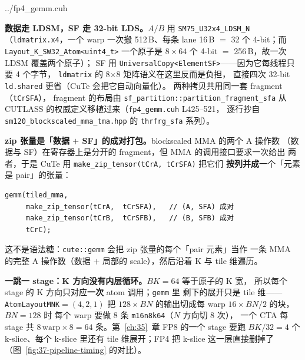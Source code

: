\begin{lstinputlisting}[linerange={794-810},firstnumber=auto,
  title={fp4\_gemm.cuh L794-810（主循环：四路 s2r + zip 张量 + 一跳一 stage）}]{../fp4_gemm.cuh}
\end{lstinputlisting}

\textbf{数据走 LDSM，SF 走 32-bit LDS。}$A/B$ 用
\texttt{SM75\_U32x4\_LDSM\_N}（\texttt{ldmatrix.x4}，一个 warp 一次搬
512\,B、每条 lane 16\,B $=$ 32 个 4-bit；而
\texttt{Layout\_K\_SW32\_Atom<uint4\_t>} 一个原子是
$8\times64$ 个 4-bit $=$ 256\,B，故一次 LDSM 覆盖两个原子）；
SF 用 \texttt{UniversalCopy<ElementSF>}——因为它每线程只要 4 个字节，
\texttt{ldmatrix} 的 8$\times$8 矩阵语义在这里反而是负担，
直接四次 32-bit \texttt{ld.shared} 更省（CuTe 会把它自动向量化）。
两种拷贝共用同一套 fragment（\texttt{tCrSFA}），
fragment 的布局由 \texttt{sf\_partition::partition\_fragment\_sfa} 从
CUTLASS 的权威定义移植过来（\texttt{fp4\_gemm.cuh} L425--521，
逐行抄自 \texttt{sm120\_blockscaled\_mma\_tma.hpp} 的
\texttt{thrfrg\_sfa} 系列）。

\textbf{zip 张量是「数据 $+$ SF」的成对打包。}blockscaled MMA 的两个 A 操作数
（数据与 SF）在寄存器上是分开的 fragment，但 MMA 的调用接口要求一次给出
两者，于是 CuTe 用 \texttt{make\_zip\_tensor(tCrA, tCrSFA)} 把它们
\textbf{按列并成}一个「元素是 pair」的张量：

\begin{verbatim}
gemm(tiled_mma,
     make_zip_tensor(tCrA,  tCrSFA),   // (A, SFA) 成对
     make_zip_tensor(tCrB,  tCrSFB),   // (B, SFB) 成对
     tCrC);
\end{verbatim}

这不是语法糖：\texttt{cute::gemm} 会把 zip 张量的每个「pair 元素」当作
一条 MMA 的完整 A 操作数（数据 $+$ 局部的 scale），然后沿着 K 与
tile 维遍历。

\textbf{一跳一 stage：K 方向没有内层循环。}$BK{=}64$ 等于原子的 K 宽，
所以每个 stage 的 K 方向只对应\textbf{一次} atom 调用；\texttt{gemm} 里
剩下的展开只是 tile 维——\texttt{AtomLayoutMNK}$=(4,2,1)$ 把
$128\times BN$ 的输出切成每 warp $16\times BN/2$ 的块，$BN{=}128$ 时
每个 warp 要做 $8$ 条 \texttt{m16n8k64}（$N$ 方向切 8 次），
一个 CTA 每 stage 共 $8\,\text{warp}\times8 = 64$ 条。第~\ref{ch:35}~章
FP8 的一个 stage 要跑 $BK/32 = 4$ 个 k-slice、每个 k-slice 里还有
tile 维展开；FP4 把 k-slice 这一层直接删掉了（图~\ref{fig:37-pipeline-timing}
的对比）。

